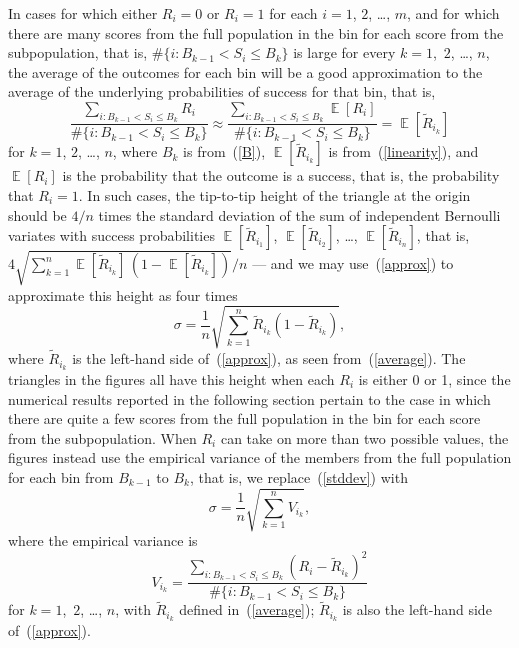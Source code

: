 \documentclass{article}
\DeclareMathOperator{\E}{\mathop{}\mathbb{E}}
\begin{document}
In cases for which either $R_i = 0$ or $R_i = 1$
for each $i = 1$, $2$, \dots, $m$,
and for which there are many scores from the full population in the bin
for each score from the subpopulation, that is, 
$\#\{i : B_{k-1} < S_i \le B_k\}$ is large for every $k = 1$,~$2$, \dots, $n$,
the average of the outcomes for each bin will be a good approximation
to the average of the underlying probabilities of success for that bin,
that is,
%
\begin{equation}
\label{approx}
\frac{\sum_{i : B_{k-1} < S_i \le B_k} R_i}{\#\{i : B_{k-1} < S_i \le B_k\}}
\approx
\frac{\sum_{i : B_{k-1} < S_i \le B_k} \E[ R_i ]}
     {\#\{i : B_{k-1} < S_i \le B_k\}}
= \E[ \tilde{R}_{i_k} ]
\end{equation}
%
for $k = 1$, $2$, \dots, $n$, where $B_k$ is from~(\ref{B}),
$\E[ \tilde{R}_{i_k} ]$ is from~(\ref{linearity}),
and $\E[ R_i ]$ is the probability that the outcome is a success,
that is, the probability that $R_i = 1$.
In such cases, the tip-to-tip height of the triangle at the origin should be
$4/n$ times the standard deviation of the sum of independent Bernoulli variates
with success probabilities $\E[ \tilde{R}_{i_1} ]$, $\E[ \tilde{R}_{i_2} ]$,
\dots, $\E[ \tilde{R}_{i_n} ]$, that is,
$4 \sqrt{\sum_{k=1}^n \E[ \tilde{R}_{i_k} ] \, (1-\E[ \tilde{R}_{i_k} ])} / n$
--- and we may use~(\ref{approx}) to approximate this height as four times
%
\begin{equation}
\label{stddev}
\sigma = \frac{1}{n} \sqrt{\sum_{k=1}^n \tilde{R}_{i_k} (1-\tilde{R}_{i_k})},
\end{equation}
%
where $\tilde{R}_{i_k}$ is the left-hand side of~(\ref{approx}),
as seen from~(\ref{average}).
The triangles in the figures all have this height
when each $R_i$ is either 0 or 1,
since the numerical results reported in the following section
pertain to the case in which there are quite a few scores
from the full population in the bin for each score from the subpopulation.
When $R_i$ can take on more than two possible values,
the figures instead use the empirical variance
of the members from the full population for each bin from $B_{k-1}$ to $B_k$,
that is, we replace~(\ref{stddev}) with
%
\begin{equation}
\label{empiricalstddev}
\sigma = \frac{1}{n} \sqrt{\sum_{k=1}^n V_{i_k}},
\end{equation}
%
where the empirical variance is
%
\begin{equation}
\label{varest}
V_{i_k} = \frac{\sum_{i : B_{k-1} < S_i \le B_k} (R_i - \tilde{R}_{i_k})^2}
               {\#\{i : B_{k-1} < S_i \le B_k\}}
\end{equation}
%
for $k = 1$,~$2$, \dots, $n$,
with $\tilde{R}_{i_k}$ defined in~(\ref{average});
$\tilde{R}_{i_k}$ is also the left-hand side of~(\ref{approx}).
\end{document}
